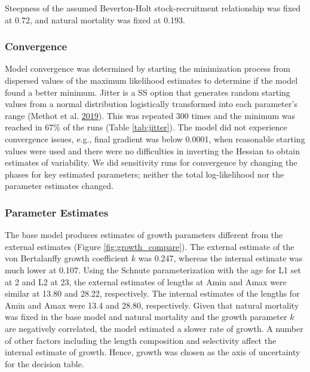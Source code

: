 \documentclass[12pt,]{article}
\begin{document}
Steepness of the assumed Beverton-Holt stock-recruitment relationship
was fixed at 0.72, and natural mortality was fixed at 0.193.

\subsubsection{Convergence}\label{convergence}

Model convergence was determined by starting the minimization process
from dispersed values of the maximum likelihood estimates to determine
if the model found a better minimum. Jitter is a SS option that
generates random starting values from a normal distribution logistically
transformed into each parameter's range (Methot et al.
\protect\hyperlink{ref-Methot2019}{2019}). This was repeated 300 times
and the minimum was reached in 67\% of the runs (Table
\ref{tab:jitter}). The model did not experience convergence issues,
e.g., final gradient was below 0.0001, when reasonable starting values
were used and there were no difficulties in inverting the Hessian to
obtain estimates of variability. We did sensitivity runs for convergence
by changing the phases for key estimated parameters; neither the total
log-likelihood nor the parameter estimates changed.

\subsubsection{Parameter Estimates}\label{parameter-estimates}

The base model produces estimates of growth parameters different from
the external estimates (Figure \ref{fig:growth_compare}). The external
estimate of the von Bertalanffy growth coefficient \(k\) was 0.247,
whereas the internal estimate was much lower at 0.107. Using the Schnute
parameterization with the age for L1 set at 2 and L2 at 23, the external
estimates of lengths at Amin and Amax were similar at 13.80 and 28.22,
respectively. The internal estimates of the lengths for Amin and Amax
were 13.4 and 28.80, respectively. Given that natural mortality was
fixed in the base model and natural mortality and the growth parameter
\(k\) are negatively correlated, the model estimated a slower rate of
growth. A number of other factors including the length composition and
selectivity affect the internal estimate of growth. Hence, growth was
chosen as the axis of uncertainty for the decision table.
\end{document}
